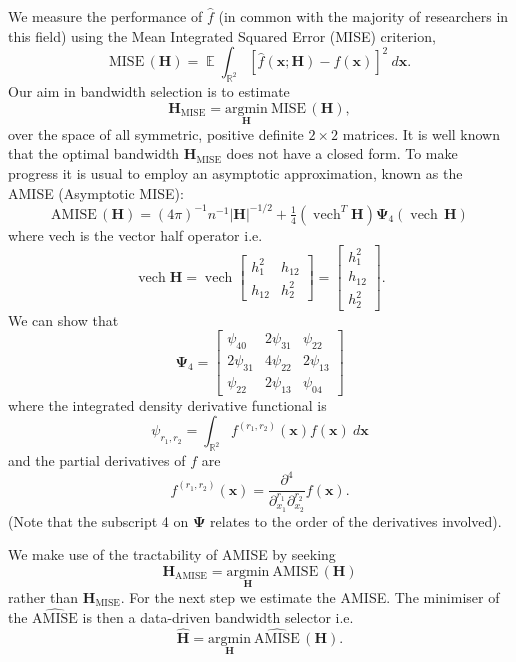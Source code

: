 \documentclass[a4paper,11pt]{article}
\renewcommand{\vec}[1]{\boldsymbol{#1}}
\newcommand{\mat}[1]{\mathbf{#1}}
\newcommand{\gmat}[1]{\boldsymbol{#1}}
\def\HH{\mat{H}}
\def\MISE{\mathrm{MISE}}
\def\AMISE{\mathrm{AMISE}}
\def\vecx{\vec{x}}
\DeclareMathOperator{\E}{\boldsymbol{\mathbb{E}}}
\DeclareMathOperator{\VECH}{vech}
\begin{document}
We measure the performance of $\hat f$ (in common with the 
majority of researchers in this field) 
using the Mean Integrated Squared Error (MISE) criterion, 
$$
\MISE \, (\HH)
= \E \int_{\mathbb{R}^2} [ \hat{f}(\vecx; \HH) - f(\vecx) ] ^2
\ d \vecx.
$$
Our aim in bandwidth selection is to estimate
$$\HH_\MISE = \underset{\HH}{\mathrm{argmin}} \
\MISE \,(\HH),
$$
over the space of all symmetric, positive definite $2 \times 2$ 
matrices. It is
well known that the optimal bandwidth $\HH_{\MISE}$ does not have a closed form. 
To make progress it is usual to employ an asymptotic approximation, known 
as the AMISE (Asymptotic MISE): 
\begin{equation}
\AMISE \,(\HH) = (4\pi)^{-1}  n^{-1}  |\HH| ^{-1/2}
 + \tfrac{1}{4} (\VECH^T \HH) \gmat{\Psi}_4(\VECH \, \HH)
\label{eq:amise}
\end{equation}
where  vech is the vector half 
operator i.e.
$$\VECH \HH = \VECH \begin{bmatrix} h_1^2  & h_{12} \\ h_{12} & h_2^2 \end{bmatrix}
= \begin{bmatrix} h_1^2 \\ h_{12} \\ h_2^2 \end{bmatrix}.$$ 
We can show that 
\begin{equation}
\gmat{\Psi}_4 =
\begin{bmatrix}\psi_{40} & 2\psi_{31} & \psi_{22} \\
2\psi_{31} & 4\psi_{22} & 2\psi_{13} \\
\psi_{22} & 2\psi_{13} & \psi_{04}
\end{bmatrix}
\label{Psi}
\end{equation}
where the integrated density derivative functional is
$$
\psi_{r_1, r_2} = \int_{\mathbb{R}^2} 
f^{(r_1, r_2)} (\vecx) f(\vecx)\ d \vecx
$$
and the partial derivatives of $f$ are $$
f^{(r_1, r_2)} (\vecx) =  \frac{\partial^{4}} 
{\partial^{r_1}_{x_1} \partial^{r_2}_{x_2}} f(\vecx). 
$$
(Note that the subscript 4 on $\gmat{\Psi}$ relates to the order of the 
derivatives involved).

We make use of the tractability of AMISE by seeking
$$
\HH_\AMISE = \underset{\HH}{\mathrm{argmin}} \ \AMISE \,
(\HH)
$$
rather than $\HH_\MISE$. 
For the next step we estimate the AMISE. The
minimiser of the $\widehat{\AMISE}$ is then a data-driven bandwidth selector
i.e. \begin{equation} 
\hat{\HH} = \underset{\HH}{\mathrm{argmin}} \ \widehat{\AMISE} \,
(\HH).
\end{equation}
\end{document}

